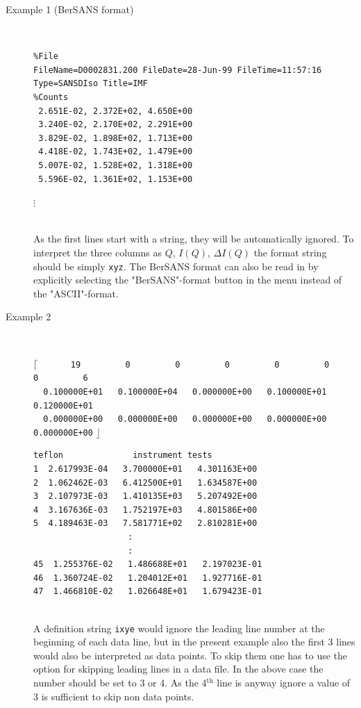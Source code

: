 \begin{description}
\item[Example 1 (BerSANS format)] ~\\
{\tiny
\begin{verbatim}
%File
FileName=D0002831.200 FileDate=28-Jun-99 FileTime=11:57:16
Type=SANSDIso Title=IMF
%Counts
 2.651E-02, 2.372E+02, 4.650E+00
 3.240E-02, 2.170E+02, 2.291E+00
 3.829E-02, 1.898E+02, 1.713E+00
 4.418E-02, 1.743E+02, 1.479E+00
 5.007E-02, 1.528E+02, 1.318E+00
 5.596E-02, 1.361E+02, 1.153E+00
\end{verbatim}
} \centerline{$\vdots$ \hspace{5cm} ~}
~\\
As the first lines start with a string, they will be automatically
ignored. To interpret the three columns as $Q$, $I(Q)$, $\Delta
I(Q)$ the format string should be simply {\tt xyz}. The BerSANS
format can also be read in by explicitly selecting
the "BerSANS"-format button in the menu instead of the
"ASCII"-format. \\[1cm]

\item[Example 2] \hspace{1pt}\\
{\tiny
\textcolor[rgb]{0.98,0.00,0.00}{$\mathbf{\lceil}$}
\verb"      19         0         0         0         0         0         0         6"\\
\verb"  0.100000E+01   0.100000E+04   0.000000E+00   0.100000E+01   0.120000E+01"\\
\verb"  0.000000E+00   0.000000E+00   0.000000E+00   0.000000E+00   0.000000E+00"
\textcolor[rgb]{0.98,0.00,0.00}{$\mathbf{\rfloor}$}
\begin{verbatim}
teflon              instrument tests
1  2.617993E-04   3.700000E+01   4.301163E+00
2  1.062462E-03   6.412500E+01   1.634587E+00
3  2.107973E-03   1.410135E+03   5.207492E+00
4  3.167636E-03   1.752197E+03   4.801586E+00
5  4.189463E-03   7.581771E+02   2.810281E+00
                   :
                   :
45  1.255376E-02   1.486688E+01   2.197023E-01
46  1.360724E-02   1.204012E+01   1.927716E-01
47  1.466810E-02   1.026648E+01   1.679423E-01
\end{verbatim}
}
~\\
A definition string {\tt ixye} would ignore the leading line number
at the beginning of each data line, but in the present example also
the first 3 lines would also be interpreted as data points. To skip
them one has to use the option for skipping leading lines in a data
file. In the above case the number should be set to 3 or 4. As the
4$^\text{th}$ line is anyway ignore a value of 3 is sufficient to
skip non data points.
\\[1cm]


\end{description}
